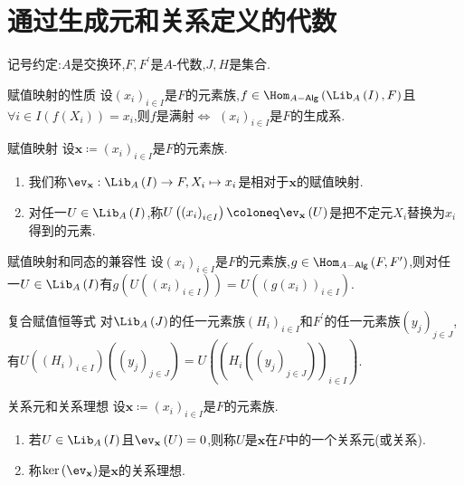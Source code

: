 \section{通过生成元和关系定义的代数}

记号约定:$A$是交换环,$F,F^{\prime}$是$A$-代数,$J,H$是集合.

\begin{proposition}{赋值映射的性质}{}
	设$\left(x_{i}\right)_{i\in I}$是$F$的元素族,$f\in\Hom_{A-\mathsf{Alg}}\left(\Lib_{A}\left(I\right),F\right)$且$\forall i\in I\left(f\left(X_{i}\right)\right)=x_{i}$,则$f$是满射$\iff$ $\left(x_{i}\right)_{i\in I}$是$F$的生成系.
\end{proposition}

\begin{definition}{赋值映射}{}
	设$\mathbf{x}\coloneq\left(x_{i}\right)_{i\in I}$是$F$的元素族.
	\begin{enumerate}
		\item 我们称$\ev_{\mathbf{x}}:\Lib_{A}\left(I\right)\to F,X_{i}\mapsto x_{i}$是相对于$\mathbf{x}$的赋值映射.
		\item 对任一$U\in\Lib_{A}\left(I\right)$,称$U\left(\left(x_{i}\right)_{i\in I}\right)\coloneq\ev_{\mathbf{x}}\left(U\right)$是把不定元$X_{i}$替换为$x_{i}$得到的元素.
	\end{enumerate}
\end{definition}

\begin{proposition}{赋值映射和同态的兼容性}{}
	设$\left(x_{i}\right)_{i\in I}$是$F$的元素族,$g\in\Hom_{A-\mathsf{Alg}}\left(F,F^{\prime}\right)$,则对任一$U\in\Lib_{A}\left(I\right)$有$g\left(U\left(\left(x_{i}\right)_{i\in I}\right)\right)=U\left(\left(g\left(x_{i}\right)\right)_{i\in I}\right)$.
\end{proposition}

\begin{proposition}{复合赋值恒等式}{}
	对$\Lib_{A}\left(J\right)$的任一元素族$\left(H_{i}\right)_{i\in I}$和$F^{\prime}$的任一元素族$\left(y_{j}\right)_{j\in J}$,有$U\left(\left(H_{i}\right)_{i\in I}\right)\left(\left(y_{j}\right)_{j\in J}\right)=U\left(\left(H_{i}\left(\left(y_{j}\right)_{j\in J}\right)\right)_{i\in I}\right)$.
\end{proposition}

\begin{definition}{关系元和关系理想}{}
	设$\mathbf{x}\coloneq\left(x_{i}\right)_{i\in I}$是$F$的元素族.
	\begin{enumerate}
		\item 若$U\in\Lib_{A}\left(I\right)$且$\ev_{\mathbf{x}}\left(U\right)=0$,则称$U$是$\mathbf{x}$在$F$中的一个关系元(或关系).
		\item 称$\ker\left(\ev_{\mathbf{x}}\right)$是$\mathbf{x}$的关系理想.
	\end{enumerate}
\end{definition}

